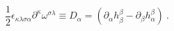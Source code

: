\begin{equation}
\frac{1}{2}\epsilon _{\kappa \lambda \sigma \alpha }\partial ^{\kappa
}\omega ^{\sigma \lambda }\equiv D_{\alpha }=\left( \partial _{\alpha
}h_{\beta }^{\beta }-\partial _{\beta }h_{\alpha }^{\beta }\right) \ .
\label{fafa}
\end{equation}%
